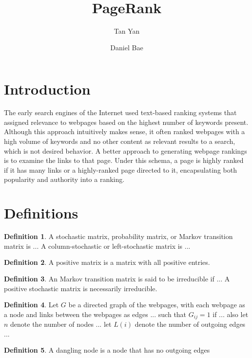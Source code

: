 \documentclass[11pt]{article}
\title{PageRank}
\author{Tan Yan \and Daniel Bae}
\theoremstyle{definition}
\newtheorem{definition}{Definition}
\begin{document}
\maketitle

\section{Introduction}
The early search engines of the Internet used text-based ranking systems that assigned relevance to webpages based on the highest number of keywords present. 
Although this approach intuitively makes sense, it often ranked webpages with a high volume of keywords and no other content as relevant results to a search, which is not desired behavior.
A better approach to generating webpage rankings is to examine the links to that page.
Under this schema, a page is highly ranked if it has many links or a highly-ranked page directed to it, encapsulating both popularity and authority into a ranking.

\section{Definitions}
\begin{definition}
    A stochastic matrix, probability matrix, or Markov transition matrix is ...
    A column-stochastic or left-stochastic matrix is ...
\end{definition}

\begin{definition}
    A positive matrix is a matrix with all positive entries.
\end{definition}

\begin{definition}
    An Markov transition matrix is said to be irreducible if ...
    A positive stochastic matrix is necessarily irreducible.
\end{definition}

\begin{definition}
    Let $G$ be a directed graph of the webpages, with each webpage as a node and links between the webpages as edges ... such that $G_{ij} = 1$ if ...
    also let $n$ denote the number of nodes ...
    let $L(i)$ denote the number of outgoing edges ...
\end{definition}

\begin{definition}
    A dangling node is a node that has no outgoing edges
\end{definition}
\end{document}
